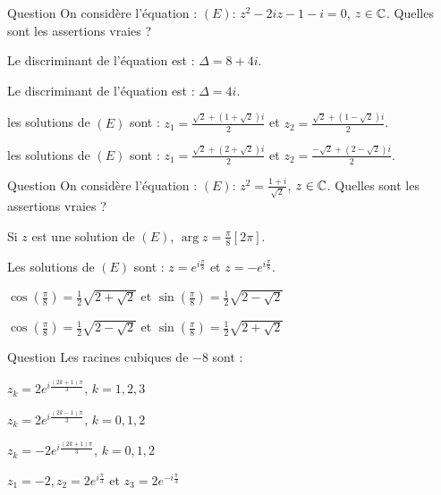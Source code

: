 \begin{multi}[multiple,feedback=
{Utiliser la méthode de résolution d'une équation du second degré.
}]{Question}
On considère l'équation : \((E) : \, z^2-2iz-1-i=0\), \(z\in \mathbb{C}\).   Quelles sont les assertions vraies ?

    \item Le discriminant de l'équation est : \(\Delta = 8+4i\).
    \item* Le discriminant de l'équation est : \(\Delta = 4i\).
    \item les solutions de \((E)\) sont :  \(z_1=\frac{\sqrt 2+ (1+\sqrt 2)i}{2}\) et \(z_2=\frac{\sqrt 2+ (1-\sqrt 2)i}{2}\).
    \item* les solutions de \((E)\) sont : \(z_1=\frac{\sqrt 2+ (2+\sqrt 2)i}{2}\) et \(z_2=\frac{-\sqrt 2+ (2-\sqrt 2)i}{2}\).
\end{multi}


\begin{multi}[multiple,feedback=
{Utiliser l'écriture géométrique et algébrique pour résoudre l'équation et identifier la partie réelle et la partie imaginaire.
}]{Question}
On considère l'équation : \((E) : \, z^2 = \frac{1+i}{\sqrt 2}\), \(z\in \mathbb{C}\).   Quelles sont les assertions vraies ?

    \item Si \(z\) est une solution de \((E)\), \(\arg z = \frac{\pi}{8} [2\pi]\).
    \item* Les solutions de \((E)\) sont :  \(z=e^{i\frac{\pi}{8}}\) et \(z=-e^{i\frac{\pi}{8}}\).
    \item* \(\cos(\frac{\pi}{8})= \frac{1}{2}\sqrt{2+\sqrt2}\) et
\(\sin(\frac{\pi}{8})= \frac{1}{2}\sqrt{2-\sqrt2}\)
    \item \(\cos(\frac{\pi}{8})= \frac{1}{2}\sqrt{2-\sqrt2}\) et
\(\sin(\frac{\pi}{8})= \frac{1}{2}\sqrt{2+\sqrt2}\)
\end{multi}


\begin{multi}[multiple,feedback=
{On résout l'équation \(z^3=-8 = 2^3e^{i\pi}\), en utilisant l'écriture géométrique.
}]{Question}
Les racines cubiques de \(-8\) sont :

    \item* \(z_k= 2e^{i\frac{(2k+1)\pi}{3}}\), \(k=1,2,3\)
    \item* \(z_k= 2e^{i\frac{(2k-1)\pi}{3}}\), \(k=0,1,2\)
    \item \(z_k= -2e^{i\frac{(2k+1)\pi}{3}}\), \(k=0,1,2\)
    \item* \(z_1= -2, z_2=2e^{i\frac{\pi}{3}}\) et \(z_3=2e^{-i\frac{\pi}{3}}\)
\end{multi}


